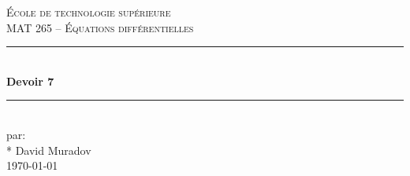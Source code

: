 \documentclass[11pt, letterpaper]{article}
\begin{document}
\begin{titlepage}
\center

\vspace*{2cm}

\textsc{\LARGE École de technologie supérieure}\\[1cm]
\textsc{\Large MAT 265 -- Équations différentielles}\\[1.5cm]

\rule{\linewidth}{0.5mm} \\[0.5cm]
{\LARGE \bfseries Devoir 7} \\[0.2cm]
\rule{\linewidth}{0.5mm} \\[3cm]

\large par: \\*
    David Muradov\\[8cm]


{\large \today }\\[3cm]

\vfill
\end{titlepage}







\end{document}
